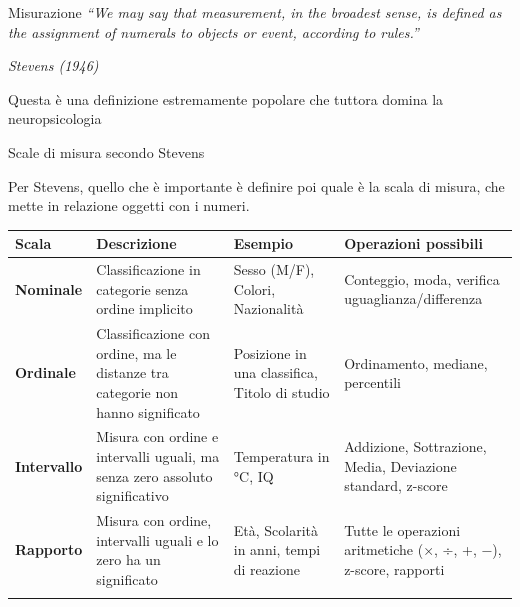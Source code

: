 \documentclass[
  ignorenonframetext,
  aspectratio=169,
]{beamer}
\begin{document}
\begin{frame}{Misurazione}
\label{misurazione}
\emph{``We may say that measurement, in the broadest sense, is defined
as the assignment of numerals to objects or event, according to
rules.''}

\emph{Stevens (1946)} \pause \vspace{2em}

Questa è una definizione estremamente popolare che tuttora domina la
neuropsicologia
\end{frame}

\begin{frame}{Scale di misura secondo Stevens}
\label{scale-di-misura-secondo-stevens}
\scriptsize

Per Stevens, quello che è importante è definire poi quale è la scala di
misura, che mette in relazione oggetti con i numeri.

\tiny

\begin{longtable}[]{@{}
  >{\raggedright\arraybackslash}p{}
  >{\raggedright\arraybackslash}p{}
  >{\raggedright\arraybackslash}p{}
  >{\raggedright\arraybackslash}p{}@{}}
\toprule\noalign{}
\begin{minipage}[b]{\linewidth}\raggedright
Scala
\end{minipage} & \begin{minipage}[b]{\linewidth}\raggedright
Descrizione
\end{minipage} & \begin{minipage}[b]{\linewidth}\raggedright
Esempio
\end{minipage} & \begin{minipage}[b]{\linewidth}\raggedright
Operazioni possibili
\end{minipage} \\
\midrule\noalign{}
\endhead
\textbf{Nominale} & Classificazione in categorie senza ordine implicito
& Sesso (M/F), Colori, Nazionalità & Conteggio, moda, verifica
uguaglianza/differenza \\
\textbf{Ordinale} & Classificazione con ordine, ma le distanze tra
categorie non hanno significato & Posizione in una classifica, Titolo di
studio & Ordinamento, mediane, percentili \\
\textbf{Intervallo} & Misura con ordine e intervalli uguali, ma senza
zero assoluto significativo & Temperatura in °C, IQ & Addizione,
Sottrazione, Media, Deviazione standard, z-score \\
\textbf{Rapporto} & Misura con ordine, intervalli uguali e lo zero ha un
significato & Età, Scolarità in anni, tempi di reazione & Tutte le
operazioni aritmetiche (×, ÷, +, −), z-score, rapporti \\
\bottomrule\noalign{}
\end{longtable}


\end{frame}
\end{document}

